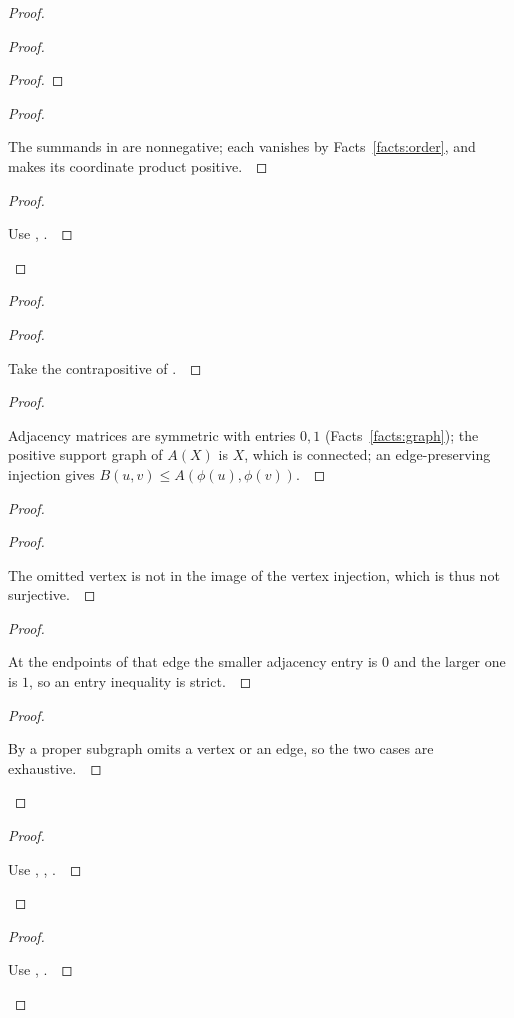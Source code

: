 \documentclass[11pt]{amsart}
\let\qed\relax
\theoremstyle{definition}
\begin{document}
\begin{proof}
\begin{proof}
\begin{proof}
\end{proof}
\begin{proof}
\pf\ \raggedright The summands in  are nonnegative; each vanishes by Facts~\ref{facts:order}, and  makes its coordinate product positive.~\qed
\end{proof}
\qedstep
\begin{proof}
\pf\ \raggedright Use , .~\qed
\end{proof}
\end{proof}
\begin{proof}
\begin{proof}
\pf\ \raggedright Take the contrapositive of .~\qed
\end{proof}
\begin{proof}
\pf\ \raggedright Adjacency matrices are symmetric with entries $0,1$ (Facts~\ref{facts:graph}); the positive support graph of $A(X)$ is $X$, which is connected; an edge-preserving injection gives $B(u,v)\le A(\phi(u),\phi(v))$.~\qed
\end{proof}
\begin{proof}
\begin{proof}
\pf\ \raggedright The omitted vertex is not in the image of the vertex injection, which is thus not surjective.~\qed
\end{proof}
\begin{proof}
\pf\ \raggedright At the endpoints of that edge the smaller adjacency entry is $0$ and the larger one is $1$, so an entry inequality is strict.~\qed
\end{proof}
\qedstep
\begin{proof}
\pf\ \raggedright By  a proper subgraph omits a vertex or an edge, so the two cases are exhaustive.~\qed
\end{proof}
\end{proof}
\qedstep
\begin{proof}
\pf\ \raggedright Use , , .~\qed
\end{proof}
\end{proof}
\qedstep
\begin{proof}
\pf\ \raggedright Use , .~\qed
\end{proof}
\end{proof}
\end{document}
